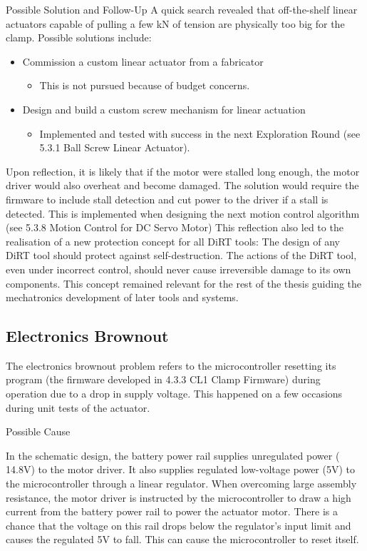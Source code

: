     Possible Solution and Follow-Up
A quick search revealed that off-the-shelf linear actuators capable of pulling a few kN of tension are physically too big for the clamp. Possible solutions include:
\begin{itemize}
    \item Commission a custom linear actuator from a fabricator
    \begin{itemize}
        \item This is not pursued because of budget concerns.
    \end{itemize}
    \item Design and build a custom screw mechanism for linear actuation
    \begin{itemize}
        \item Implemented and tested with success in the next Exploration Round (see 5.3.1 Ball Screw Linear Actuator). 
    \end{itemize}
\end{itemize}

Upon reflection, it is likely that if the motor were stalled long enough, the motor driver would also overheat and become damaged. The solution would require the firmware to include stall detection and cut power to the driver if a stall is detected. This is implemented when designing the next motion control algorithm (see 5.3.8 Motion Control for DC Servo Motor)
This reflection also led to the realisation of a new protection concept for all DiRT tools: The design of any DiRT tool should protect against self-destruction. The actions of the DiRT tool, even under incorrect control, should never cause irreversible damage to its own components. This concept remained relevant for the rest of the thesis guiding the mechatronics development of later tools and systems.

\subsection{Electronics Brownout}
The electronics brownout problem refers to the microcontroller resetting its program (the firmware developed in 4.3.3 CL1 Clamp Firmware) during operation due to a drop in supply voltage. This happened on a few occasions during unit tests of the actuator.

Possible Cause

In the schematic design, the battery power rail supplies unregulated power (~ 14.8V) to the motor driver. It also supplies regulated low-voltage power (5V) to the microcontroller through a linear regulator. When overcoming large assembly resistance, the motor driver is instructed by the microcontroller to draw a high current from the battery power rail to power the actuator motor. There is a chance that the voltage on this rail drops below the regulator’s input limit and causes the regulated 5V to fall. This can cause the microcontroller to reset itself.

